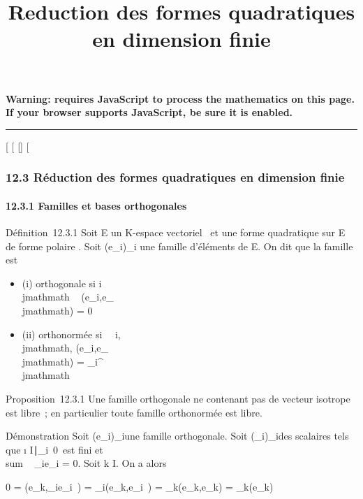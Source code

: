 \documentclass[]{article}
\title{Reduction des formes quadratiques en dimension finie}
\author{}
\date{}
\begin{document}
\maketitle

\textbf{Warning: 
requires JavaScript to process the mathematics on this page.\\ If your
browser supports JavaScript, be sure it is enabled.}

\begin{center}\rule{3in}{0.4pt}\end{center}

{[}
{[}
{[}{]}
{[}

\subsubsection{12.3 Réduction des formes quadratiques en dimension
finie}

\paragraph{12.3.1 Familles et bases orthogonales}

Définition~12.3.1 Soit E un K-espace vectoriel ~et \Phi une forme
quadratique sur E de forme polaire \phi. Soit (e_i)_i\inI
une famille d'éléments de E. On dit que la famille est

\begin{itemize}
\itemsep1pt\parskip0pt
\item
  (i) orthogonale si i\neq~\\jmathmath \rigtharrow~
  \phi(e_i,e_\\jmathmath) = 0
\item
  (ii) orthonormée si \forall~~i,\\jmathmath,
  \phi(e_i,e_\\jmathmath) = \delta_i^\\jmathmath
\end{itemize}

Proposition~12.3.1 Une famille orthogonale ne contenant pas de vecteur
isotrope est libre~; en particulier toute famille orthonormée est libre.

Démonstration Soit (e_i)_i\inI une famille orthogonale.
Soit (\lambda_i)_i\inI des scalaires tels que
\i \in
I∣\lambda_i\mathrel\neq~0\
est fini et \\sum ~
\lambda_ie_i = 0. Soit k \in I. On a alors

0 = \phi(e_k,\sum \lambda_ie_i~)
= \sum \lambda_i\phi(e_k,e_i~) =
\lambda_k\phi(e_k,e_k) = \lambda_k\Phi(e_k)
\end{document}
